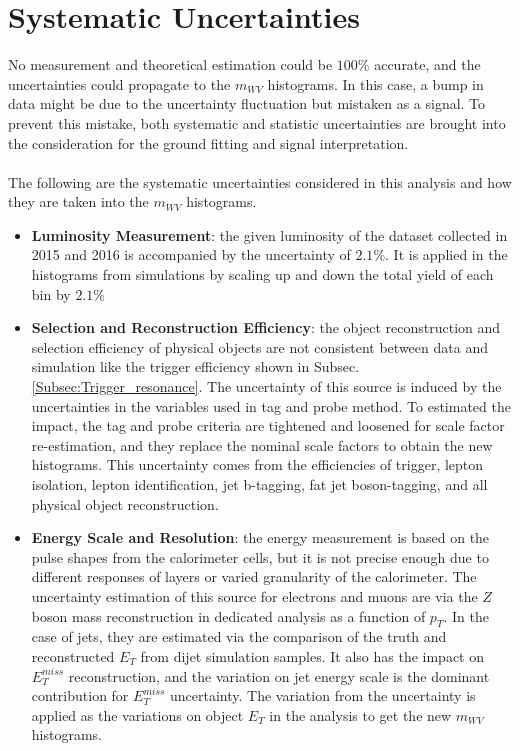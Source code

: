 \section{Systematic Uncertainties}
No measurement and theoretical estimation could be $100\%$ accurate, and the uncertainties could propagate to the $m_{WV}$ histograms. In this case, a bump in data might be due to the uncertainty fluctuation but mistaken as a signal. To prevent this mistake, both systematic and statistic uncertainties are brought into the consideration for the ground fitting and signal interpretation.
\\
\\The following are the systematic uncertainties considered in this analysis and how they are taken into the $m_{WV}$ histograms.
\begin{itemize}
	\item{\bf Luminosity Measurement}: the given luminosity of the dataset collected in 2015 and 2016 is accompanied by the uncertainty of $2.1\%$. It is applied in the histograms from simulations by scaling up and down the total yield of each bin by $2.1\%$

	\item{\bf Selection and Reconstruction Efficiency}: the object reconstruction and selection efficiency of physical objects are not consistent between data and simulation like the trigger efficiency shown in Subsec. \ref{Subsec:Trigger_resonance}. The uncertainty of this source is induced by the uncertainties in the variables used in tag and probe method. To estimated the impact, the tag and probe criteria are tightened and loosened for scale factor re-estimation, and they replace the nominal scale factors to obtain the new histograms. This uncertainty comes from the efficiencies of trigger, lepton isolation, lepton identification, jet b-tagging, fat jet boson-tagging, and all physical object reconstruction. 

	\item{\bf Energy Scale and Resolution}: the energy measurement is based on the pulse shapes from the calorimeter cells, but it is not precise enough due to different responses of layers or varied granularity of the calorimeter. The uncertainty estimation of this source for electrons and muons are via the $Z$ boson mass reconstruction in dedicated analysis as a function of $p_{T}$. In the case of jets, they are estimated via the comparison of the truth and reconstructed $E_{T}$ from dijet simulation samples. It also has the impact on $E^{miss}_{T}$ reconstruction, and the variation on jet energy scale is the dominant contribution for $E^{miss}_{T}$ uncertainty. The variation from the uncertainty is applied as the variations on object $E_T$ in the analysis to get the new $m_{WV}$ histograms.


\end{itemize}
